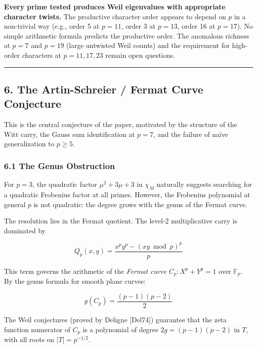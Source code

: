 \documentclass[
  11pt,
]{article}
\begin{document}
\textbf{Every prime tested produces Weil eigenvalues with appropriate character
twists.} The productive character order appears to depend on \(p\) in a
non-trivial way (e.g., order 5 at \(p = 11\), order 3 at \(p = 13\), order 16 at
\(p = 17\)). No simple arithmetic formula predicts the productive order. The
anomalous richness at \(p = 7\) and \(p = 19\) (large untwisted Weil counts) and
the requirement for high-order characters at \(p = 11, 17, 23\) remain open
questions.

\begin{center}\rule{0.5\linewidth}{0.5pt}\end{center}

\newpage

\subsection{6. The Artin-Schreier / Fermat Curve
Conjecture}\label{the-artin-schreier-fermat-curve-conjecture}

This is the central conjecture of the paper, motivated by the structure of the
Witt carry, the Gauss sum identification at \(p = 7\), and the failure of naïve
generalization to \(p \geq 5\).

\subsubsection{6.1 The Genus Obstruction}\label{the-genus-obstruction}

For \(p = 3\), the quadratic factor \(\mu^2 + 3\mu + 3\) in \(\chi_M\) naturally
suggests searching for a quadratic Frobenius factor at all primes. However, the
Frobenius polynomial at general \(p\) is not quadratic: the degree grows with
the genus of the Fermat curve.

The resolution lies in the Fermat quotient. The level-2 multiplicative carry is
dominated by

\[Q_p(x, y) = \frac{x^p y^p - (xy \bmod p)^p}{p}\]

This term governs the arithmetic of the \emph{Fermat curve}
\(C_p: X^p + Y^p = 1\) over \(\mathbb{F}_p\). By the genus formula for smooth
plane curves:

\[g(C_p) = \frac{(p-1)(p-2)}{2}\]

The Weil conjectures (proved by Deligne {[}Del74{]}) guarantee that the zeta
function numerator of \(C_p\) is a polynomial of degree \(2g = (p-1)(p-2)\) in
\(T\), with all roots on \(\lvert T\rvert = p^{-1/2}\).
\end{document}
